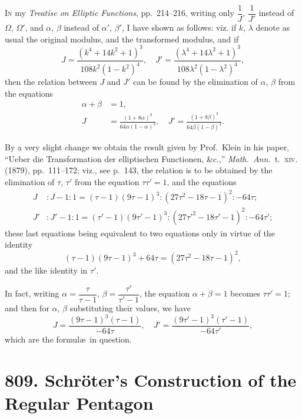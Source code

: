 \documentclass[11pt,a4paper]{book}
\begin{document}
\bigskip

\noindent
\textsc{In} my \textit{Treatise on Elliptic Functions}, pp.~214--216, writing only $\dfrac{1}{J}$, $\dfrac{1}{J'}$ instead of $\Omega$, $\Omega'$, and $\alpha$, $\beta$ instead of $\alpha'$, $\beta'$, I have shown as follows: viz. if $k$, $\lambda$ denote as usual the original modulus, and the transformed modulus, and if
\[
J = \frac{(k^4+14k^2+1)^3}{108k^2(1-k^2)^4},\quad J' = \frac{(\lambda^4+14\lambda^2+1)^3}{108\lambda^2(1-\lambda^2)^4},
\]
then the relation between $J$ and $J'$ can be found by the elimination of $\alpha$, $\beta$ from the equations
\begin{align*}
\alpha + \beta &= 1,\\
J &= \frac{(1+8\alpha)^3}{64\alpha(1-\alpha)^3},\quad J' = \frac{(1+8\beta)^3}{64\beta(1-\beta)^3}.
\end{align*}

By a very slight change we obtain the result given by Prof.~Klein in his paper, ``Ueber die Transformation der elliptischen Functionen, \&c.,'' \textit{Math.\ Ann.}\ t.~\textsc{xiv.} (1879), pp.~111--172; viz., see p.~143, the relation is to be obtained by the elimination of $\tau$, $\tau'$ from the equation $\tau\tau' = 1$, and the equations
\begin{align*}
J &: J-1 : 1 = (\tau-1)(9\tau-1)^3 : (27\tau^2 - 18\tau - 1)^2 : -64\tau;\\
J' &: J'-1 : 1 = (\tau'-1)(9\tau'-1)^3 : (27\tau'^2 - 18\tau' - 1)^2 : -64\tau';
\end{align*}
these last equations being equivalent to two equations only in virtue of the identity
\[
(\tau-1)(9\tau-1)^3 + 64\tau = (27\tau^2 - 18\tau - 1)^2,
\]
and the like identity in $\tau'$.

In fact, writing $\alpha = \dfrac{\tau}{\tau-1}$, $\beta = \dfrac{\tau'}{\tau'-1}$, the equation $\alpha + \beta = 1$ becomes $\tau\tau' = 1$; and then for $\alpha$, $\beta$ substituting their values, we have
\[
J = \frac{(9\tau-1)^3(\tau-1)}{-64\tau},\quad J' = \frac{(9\tau'-1)^3(\tau'-1)}{-64\tau'},
\]
which are the formul\ae\ in question.


\newpage
\section*{809. Schr\"{o}ter's Construction of the Regular Pentagon}
\end{document}
